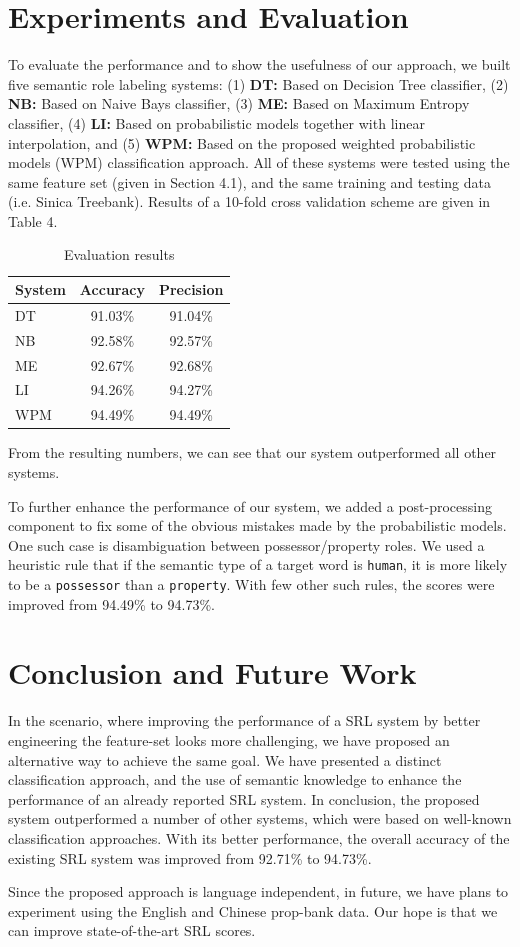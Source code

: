 \documentclass[11pt]{article}
\begin{document}
\section{Experiments and Evaluation}
To evaluate the performance and to show the usefulness of our approach, we built five semantic role labeling systems: (1) \textbf{DT:} Based on Decision Tree classifier, (2) \textbf{NB:} Based on Naive Bays classifier, (3) \textbf{ME:} Based on Maximum Entropy classifier, (4) \textbf{LI:} Based on probabilistic models together with linear interpolation, and (5) \textbf{WPM:} Based on the proposed weighted probabilistic models (WPM) classification approach. All of these systems were tested using the same feature set (given in Section 4.1), and the same training and testing data (i.e. Sinica Treebank). Results of a 10-fold cross validation scheme are given in Table 4. 
\begin{table}[!h]
\small
\begin{center}
\begin{tabular}{|l|c|c|}
\hline \bf System & \bf Accuracy &  \bf Precision\\ \hline
 DT & 91.03\% & 91.04\%  \\ 
 NB & 92.58\% & 92.57\% \\ 
 ME & 92.67\% & 92.68\% \\ 
 LI & 94.26\% &  94.27\%\\ 
 WPM & 94.49\% & 94.49\% \\ 
\hline 
\end{tabular}
\caption{Evaluation results} 
\end{center}
\normalsize
\end{table}
From the resulting numbers, we can see that our system outperformed all other systems.

To further enhance the performance of our system, we added a post-processing component to fix some of the obvious mistakes made by the probabilistic models. One such case is disambiguation between possessor/property roles. We used a heuristic rule that if the semantic type of a target word is \verb+human+, it is more likely to be a \verb+possessor+ than a \verb+property+. With few other such rules, the scores were improved from 94.49\% to 94.73\%. 
\section{Conclusion and Future Work}
In the scenario, where improving the performance of a SRL system by better engineering the feature-set looks more challenging, we have proposed an alternative way to achieve the same goal. We have presented a distinct classification approach, and the use of semantic knowledge to enhance the performance of an already reported SRL system. In conclusion, the proposed system outperformed a number of other systems, which were based on well-known classification approaches. With its better performance, the overall accuracy of the existing SRL system was improved from 92.71\% to 94.73\%. 

Since the proposed approach is language independent, in future, we have plans to experiment using the English and Chinese prop-bank data. Our hope is that we can improve state-of-the-art SRL scores.         
\clearpage


\end{document}

